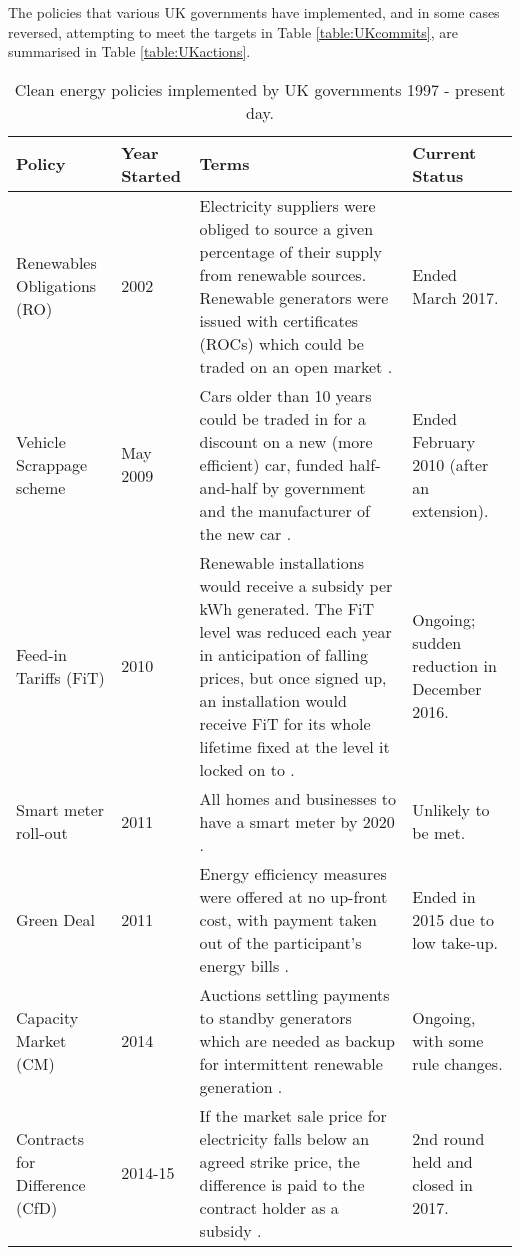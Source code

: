 \documentclass[report_18month.tex]{subfiles}
\begin{document}
The policies that various UK governments have implemented, and in some cases reversed, attempting to meet the targets in Table \ref{table:UKcommits}, are summarised in Table \ref{table:UKactions}.
\begin{center}
\begin{table}[h!]
\caption{Clean energy policies implemented by UK governments 1997 - present day.}
\begin{tabular}{ M{2.4cm} M{1.3cm} M{7.6cm} M{3cm} }
 \textbf{Policy} & \textbf{Year Started} & \textbf{Terms} & \textbf{Current Status} \\ 
\hline
 Renewables Obligations (RO) & 2002 & Electricity suppliers were obliged to source a given percentage of their supply from renewable sources. Renewable generators were issued with certificates (ROCs) which could be traded on an open market \cite{ofgem2017roc}. & Ended March 2017. \\
\hline
 Vehicle Scrappage scheme & May 2009 & Cars older than 10 years could be traded in for a  discount on a new (more efficient) car, funded half-and-half by government and the manufacturer of the new car \cite{harari2009vehiclescrap}. & Ended February 2010 (after an extension). \\
\hline
 Feed-in Tariffs (FiT) & 2010 & Renewable installations would receive a subsidy per kWh generated. The FiT level was reduced each year in anticipation of falling prices, but once signed up, an installation would receive FiT for its whole lifetime fixed at the level it locked on to \cite{ofgem2017fit}. & Ongoing; sudden reduction in December 2016. \\
\hline
 Smart meter roll-out & 2011 & All homes and businesses to have a smart meter by 2020 \cite{ofgem2017smartmeters}. & Unlikely to be met. \\
\hline
 Green Deal & 2011 & Energy efficiency measures were offered at no up-front cost, with payment taken out of the participant's energy bills \cite{greendeal2017}. & Ended in 2015 due to low take-up. \\
\hline
 Capacity Market (CM) & 2014 & Auctions settling payments to standby generators which are needed as backup for intermittent renewable generation \cite{mattholie2017cm}. & Ongoing, with some rule changes. \\
\hline
 Contracts for Difference (CfD) & 2014-15 & If the market sale price for electricity falls below an agreed strike price, the difference is paid to the contract holder as a subsidy \cite{beis2017cfd}. & 2nd round held and closed in 2017. \\

\end{tabular}
\end{table}
\end{center}
\end{document}
